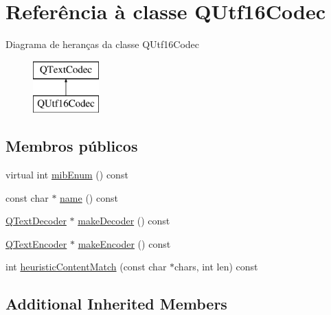 \hypertarget{class_q_utf16_codec}{\section{Referência à classe Q\-Utf16\-Codec}
\label{class_q_utf16_codec}
}
Diagrama de heranças da classe Q\-Utf16\-Codec\begin{figure}[H]
\begin{center}
\leavevmode
\includegraphics[height=2.000000cm]{class_q_utf16_codec}
\end{center}
\end{figure}
\subsection*{Membros públicos}
\begin{DoxyCompactItemize}
\item 
virtual int \hyperlink{class_q_utf16_codec_a5272a4ca2c3d9cdba1c3f2fac3e4d6bd}{mib\-Enum} () const 
\item 
const char $\ast$ \hyperlink{class_q_utf16_codec_a25844783e4bef74ca9a17519c239a27e}{name} () const 
\item 
\hyperlink{class_q_text_decoder}{Q\-Text\-Decoder} $\ast$ \hyperlink{class_q_utf16_codec_ad7f6bd53bcbf64bf6f2e75106d229e19}{make\-Decoder} () const 
\item 
\hyperlink{class_q_text_encoder}{Q\-Text\-Encoder} $\ast$ \hyperlink{class_q_utf16_codec_af324249beeb8b0b38aa7b32ba7c8c09f}{make\-Encoder} () const 
\item 
int \hyperlink{class_q_utf16_codec_ab3ad57260f7cb722cb3b237369d23044}{heuristic\-Content\-Match} (const char $\ast$chars, int len) const 
\end{DoxyCompactItemize}
\subsection*{Additional Inherited Members}


